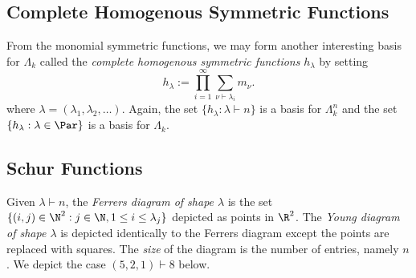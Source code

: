 \documentclass[12pt]{article}
\begin{document}
\subsection{Complete Homogenous Symmetric Functions}

From the monomial symmetric functions, we may form another interesting basis for $ \Lambda_{k} $ called the \textit{complete homogenous symmetric functions} $ h_{\lambda} $ by setting 
\[
  h_{\lambda}:=\prod_{i=1}^{\infty} \sum_{\nu\vdash \lambda_{i}} m_{\nu}.
\]
where $ \lambda = (\lambda_{1},\lambda_{2},\ldots) $. Again, the set $ \{h_{\lambda}: \lambda\vdash n\} $ is a basis for $ \Lambda_{k}^{n} $ and the set $ \{h_{\lambda}: \lambda\in\Par\} $ is a basis for $ \Lambda_{k} $.
\subsection{Schur Functions}

\begin{definition}\label{def:youngdiagram}
  Given $ \lambda\vdash n $, the \textit{Ferrers diagram of shape $ \lambda $} is the set $\{(i,j)\in \N^{2} : j\in \N, 1\leq i \leq \lambda_{j}\}$ depicted as points in $ \R^{2} $. The \textit{Young diagram of shape $ \lambda $} is depicted identically to the Ferrers diagram except the points are replaced with squares. The \textit{size} of the diagram is the number of entries, namely $ n $. We depict the case $ (5,2,1)\vdash 8 $ below.
\end{definition}
\end{document}
